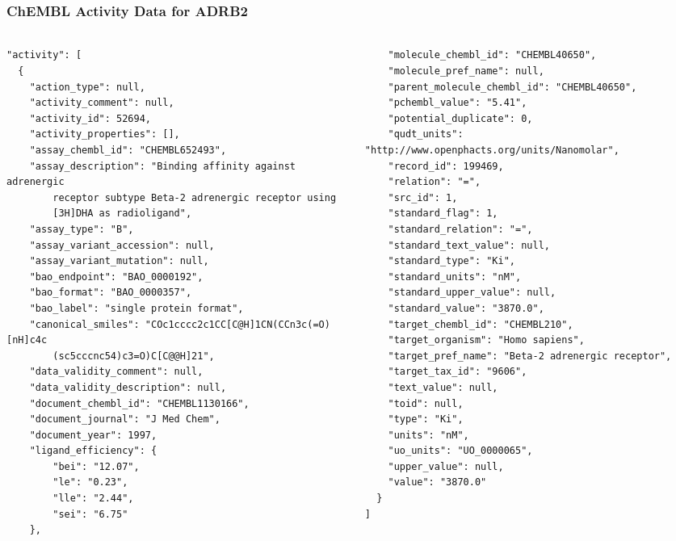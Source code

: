 \documentclass[aspectratio=169,xcolor=dvipsnames]{beamer}
\begin{document}
\begin{frame}[fragile,t]
  \frametitle{ChEMBL Activity Data for ADRB2}
  \framesubtitle{}
  \tiny
  \begin{columns}[t]
    \begin{column}{0.5\textwidth}
    \vspace{-2\baselineskip}
\begin{verbatim}
"activity": [
  {
    "action_type": null,
    "activity_comment": null,
    "activity_id": 52694,
    "activity_properties": [],
    "assay_chembl_id": "CHEMBL652493",
    "assay_description": "Binding affinity against adrenergic
        receptor subtype Beta-2 adrenergic receptor using
        [3H]DHA as radioligand",
    "assay_type": "B",
    "assay_variant_accession": null,
    "assay_variant_mutation": null,
    "bao_endpoint": "BAO_0000192",
    "bao_format": "BAO_0000357",
    "bao_label": "single protein format",
    "canonical_smiles": "COc1cccc2c1CC[C@H]1CN(CCn3c(=O)[nH]c4c
        (sc5cccnc54)c3=O)C[C@@H]21",
    "data_validity_comment": null,
    "data_validity_description": null,
    "document_chembl_id": "CHEMBL1130166",
    "document_journal": "J Med Chem",
    "document_year": 1997,
    "ligand_efficiency": {
        "bei": "12.07",
        "le": "0.23",
        "lle": "2.44",
        "sei": "6.75"
    },
\end{verbatim}
    \end{column}
    \begin{column}{0.5\textwidth}
    \vspace{-2\baselineskip}
\begin{verbatim}
    "molecule_chembl_id": "CHEMBL40650",
    "molecule_pref_name": null,
    "parent_molecule_chembl_id": "CHEMBL40650",
    "pchembl_value": "5.41",
    "potential_duplicate": 0,
    "qudt_units": "http://www.openphacts.org/units/Nanomolar",
    "record_id": 199469,
    "relation": "=",
    "src_id": 1,
    "standard_flag": 1,
    "standard_relation": "=",
    "standard_text_value": null,
    "standard_type": "Ki",
    "standard_units": "nM",
    "standard_upper_value": null,
    "standard_value": "3870.0",
    "target_chembl_id": "CHEMBL210",
    "target_organism": "Homo sapiens",
    "target_pref_name": "Beta-2 adrenergic receptor",
    "target_tax_id": "9606",
    "text_value": null,
    "toid": null,
    "type": "Ki",
    "units": "nM",
    "uo_units": "UO_0000065",
    "upper_value": null,
    "value": "3870.0"
  }
]    
\end{verbatim}
    \end{column}
  \end{columns}
\end{frame}
\end{document}
